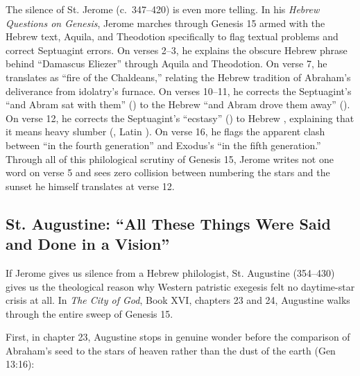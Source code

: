 The silence of St. Jerome (c.~347--420) is even more telling. In his \emph{Hebrew Questions on Genesis}, Jerome marches through Genesis 15 armed with the Hebrew text, Aquila, and Theodotion specifically to flag textual problems and correct Septuagint errors. On verses 2--3, he explains the obscure Hebrew phrase behind ``Damascus Eliezer'' through Aquila and Theodotion. On verse 7, he translates  as ``fire of the Chaldeans,'' relating the Hebrew tradition of Abraham's deliverance from idolatry's furnace. On verses 10--11, he corrects the Septuagint's ``and Abram sat with them'' () to the Hebrew ``and Abram drove them away'' (). On verse 12, he corrects the Septuagint's ``ecstasy'' () to Hebrew , explaining that it means heavy slumber (, Latin ). On verse 16, he flags the apparent clash between ``in the fourth generation'' and Exodus's ``in the fifth generation.'' Through all of this philological scrutiny of Genesis 15, Jerome writes not one word on verse 5 and sees zero collision between numbering the stars and the sunset he himself translates at verse 12.

\subsection{St. Augustine: ``All These Things Were Said and Done in a Vision''}

If Jerome gives us silence from a Hebrew philologist, St. Augustine (354--430) gives us the theological reason why Western patristic exegesis felt no daytime-star crisis at all. In \emph{The City of God}, Book XVI, chapters 23 and 24, Augustine walks through the entire sweep of Genesis 15.

First, in chapter 23, Augustine stops in genuine wonder before the comparison of Abraham's seed to the stars of heaven rather than the dust of the earth (Gen 13:16):

